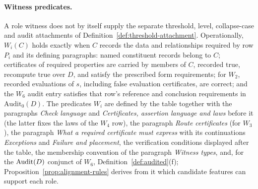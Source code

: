 \paragraph{Witness predicates.}\label{par:witness-predicates} A role witness does not by
itself supply the separate threshold, level, collapse-case and audit
attachments of Definition~\ref{def:threshold-attachment}. Operationally, \(W_i(C)\) holds exactly when \(C\) records the data and relationships required by row \(P_i\) and its defining paragraphs: named constituent records belong to \(C\); certificates of required properties are carried by members of \(C\), recorded true, recompute true over \(D\), and satisfy the prescribed form requirements; for \(W_2\), recorded evaluations of \(s\), including false evaluation certificates, are correct; and the \(W_6\) audit entry satisfies that row's reference and conclusion requirements in \(\mathrm{Audit}_0(D)\). The predicates \(W_i\) are
defined by the table together with the paragraphs \emph{Check language} and \emph{Certificates, assertion language and laws} before it (the latter fixes the laws of the \(W_4\) row), the paragraph \emph{Route certificates} (for \(W_3\)), the paragraph \emph{What a required
certificate must express} with its continuations \emph{Exceptions} and \emph{Failure and placement}, the verification conditions displayed after the
table, the membership convention of the paragraph \emph{Witness types}, and, for the \(\operatorname{Audit}\!\left(D\right)\) conjunct of \(W_6\), Definition~\ref{def:audited}(f); Proposition~\ref{prop:alignment-rules}
derives from it which candidate features can support each role.
